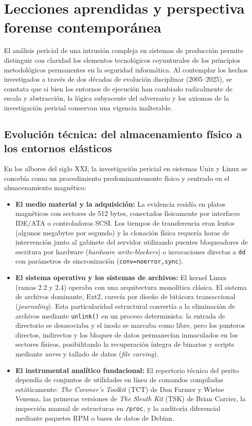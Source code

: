 \chapter{Lecciones aprendidas y perspectiva forense contemporánea}
\label{cap:retrospectiva_20_anios}

El análisis pericial de una intrusión compleja en sistemas de producción permite distinguir con claridad los elementos tecnológicos coyunturales de los principios metodológicos permanentes en la seguridad informática. Al contemplar los hechos investigados a través de dos décadas de evolución disciplinar (2005--2025), se constata que si bien los entornos de ejecución han cambiado radicalmente de escala y abstracción, la lógica subyacente del adversario y los axiomas de la investigación pericial conservan una vigencia inalterable.

\section{Evolución técnica: del almacenamiento físico a los entornos elásticos}

En los albores del siglo XXI, la investigación pericial en sistemas Unix y Linux se concebía como un procedimiento predominantemente físico y centrado en el almacenamiento magnético:
\begin{itemize}
    \item \textbf{El medio material y la adquisición:} La evidencia residía en platos magnéticos con sectores de 512 bytes, conectados físicamente por interfaces IDE/ATA o controladoras SCSI. Los tiempos de transferencia eran lentos (algunos megabytes por segundo) y la clonación física requería horas de intervención junto al gabinete del servidor utilizando puentes bloqueadores de escritura por hardware (\textit{hardware write-blockers}) o invocaciones directas a \texttt{dd} con parámetros de sincronización (\texttt{conv=noerror,sync}).
    \item \textbf{El sistema operativo y los sistemas de archivos:} El kernel Linux (ramas 2.2 y 2.4) operaba con una arquitectura monolítica clásica. El sistema de archivos dominante, Ext2, carecía por diseño de bitácora transaccional (\textit{journaling}). Esta particularidad estructural convertía a la eliminación de archivos mediante \texttt{unlink()} en un proceso determinista: la entrada de directorio se desasociaba y el inodo se marcaba como libre, pero los punteros directos, indirectos y los bloques de datos permanecían inmaculados en los sectores físicos, posibilitando la recuperación íntegra de binarios y scripts mediante \textit{unrm} y tallado de datos (\textit{file carving}).
    \item \textbf{El instrumental analítico fundacional:} El repertorio técnico del perito dependía de conjuntos de utilidades en línea de comandos compiladas estáticamente: \textit{The Coroner's Toolkit} (TCT) de Dan Farmer y Wietse Venema, las primeras versiones de \textit{The Sleuth Kit} (TSK) de Brian Carrier, la inspección manual de estructuras en \texttt{/proc}, y la auditoría diferencial mediante paquetes RPM o bases de datos de Debian.
\end{itemize}


